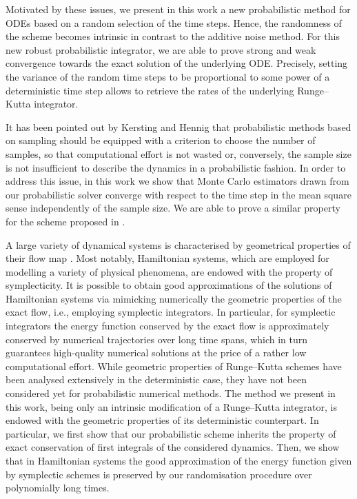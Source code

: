 \documentclass[10pt]{article}
\begin{document}
Motivated by these issues, we present in this work a new probabilistic method for ODEs based on a random selection of the time steps. Hence, the randomness of the scheme becomes intrinsic in contrast to the additive noise method. For this new robust probabilistic integrator, we are able to prove strong and weak convergence towards the exact solution of the underlying ODE. Precisely, setting the variance of the random time steps to be proportional to some power of a deterministic time step allows to retrieve the rates of the underlying Runge--Kutta integrator.

It has been pointed out by Kersting and Hennig \cite{KeH16} that probabilistic methods based on sampling should be equipped with a criterion to choose the number of samples, so that computational effort is not wasted or, conversely, the sample size is not insufficient to describe the dynamics in a probabilistic fashion. In order to address this issue, in this work we show that Monte Carlo estimators drawn from our probabilistic solver converge with respect to the time step in the mean square sense independently of the sample size. We are able to prove a similar property for the scheme proposed in \cite{CGS17}.

A large variety of dynamical systems is characterised by geometrical properties of their flow map \cite{HLW06}. Most notably, Hamiltonian systems, which are employed for modelling a variety of physical phenomena, are endowed with the property of symplecticity. It is possible to obtain good approximations of the solutions of Hamiltonian systems via mimicking numerically the geometric properties of the exact flow, i.e.,  employing symplectic integrators. In particular, for symplectic integrators the energy function conserved by the exact flow is approximately conserved by numerical trajectories over long time spans, which in turn guarantees high-quality numerical solutions at the price of a rather low computational effort. While geometric properties of Runge--Kutta schemes have been analysed extensively in the deterministic case, they have not been considered yet for probabilistic numerical methods. The method we present in this work, being only an intrinsic modification of a Runge--Kutta integrator, is endowed with the geometric properties of its deterministic counterpart. In particular, we first show that our probabilistic scheme inherits the property of exact conservation of first integrals of the considered dynamics. Then, we show that in Hamiltonian systems the good approximation of the energy function given by symplectic schemes is preserved by our randomisation procedure over polynomially long times.
\end{document}
